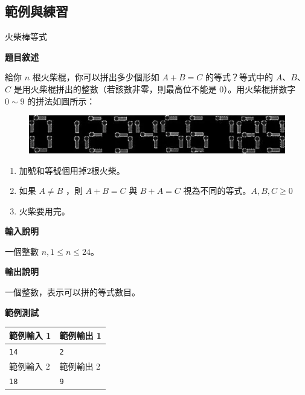    \subsection{範例與練習}

    \problem 火柴棒等式

    \textbf{題目敘述}
    
    給你 $n$ 根火柴棍，你可以拼出多少個形如 $A+B=C$ 的等式？等式中的 $A$、$B$、$C$ 是用火柴棍拼出的整數（若該數非零，則最高位不能是 $0$）。用火柴棍拼數字 $0\sim9$ 的拼法如圖所示：

    
    \begin{figure}[h]
        \centering
        \includegraphics[width=\textwidth]{../Images/Recursive_Torch.png}
    \end{figure}

    \begin{enumerate}
        \item 加號和等號個用掉$2$根火柴。
        \item 如果 $A \ne B$ ，則 $A+B=C$ 與 $B+A=C$ 視為不同的等式。$A,B,C \ge 0$
        \item 火柴要用完。
    \end{enumerate}

    \textbf{輸入說明}

    一個整數 $n, 1 \le n \le 24$。

    \textbf{輸出說明}
    
    一個整數，表示可以拼的等式數目。

    \textbf{範例測試}

    \begin{tabular}{|m{7cm}|m{7cm}|}
        \hline
        範例輸入 1 & 範例輸出 1 \\
        \hline
        \verb|14| &  \verb|2| \\
        \hline
        範例輸入 2 & 範例輸出 2 \\
        \hline
        \verb|18| &  \verb|9| \\
        \hline
    \end{tabular}
    